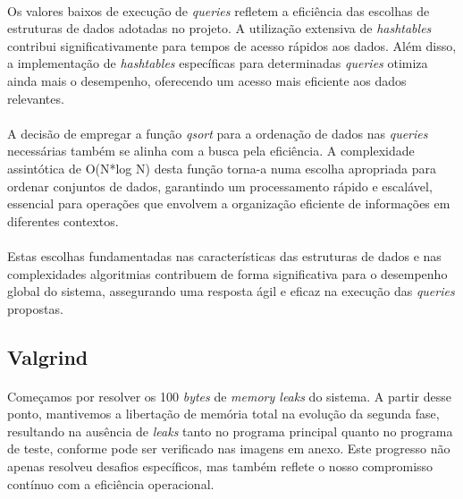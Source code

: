 \documentclass{article}
\begin{document}
\paragraph{}Os valores baixos de execução de \textit{queries} refletem a eficiência das escolhas de estruturas de dados adotadas no projeto. A utilização extensiva de \textit{hashtables} contribui significativamente para tempos de acesso rápidos aos dados. Além disso, a implementação de \textit{hashtables} específicas para determinadas \textit{queries} otimiza ainda mais o desempenho, oferecendo um acesso mais eficiente aos dados relevantes.
\vspace{-0.3cm}
\paragraph{}A decisão de empregar a função \textit{qsort} para a ordenação de dados nas \textit{queries} necessárias também se alinha com a busca pela eficiência. A complexidade assintótica de O(N*log N) desta função torna-a numa escolha apropriada para ordenar conjuntos de dados, garantindo um processamento rápido e escalável, essencial para operações que envolvem a organização eficiente de informações em diferentes contextos.
\vspace{-0.3cm}
\paragraph{}Estas escolhas fundamentadas nas características das estruturas de dados e nas complexidades algoritmias contribuem de forma significativa para o desempenho global do sistema, assegurando uma resposta ágil e eficaz na execução das \textit{queries} propostas.

\subsection{Valgrind}
\paragraph{}Começamos por resolver os 100 \textit{bytes} de \textit{memory leaks} do sistema. A partir desse ponto, mantivemos a libertação de memória total na evolução da segunda fase, resultando na ausência de \textit{leaks} tanto no programa principal quanto no programa de teste, conforme pode ser verificado nas imagens em anexo. Este progresso não apenas resolveu desafios específicos, mas também reflete o nosso compromisso contínuo com a eficiência operacional.
\end{document}
